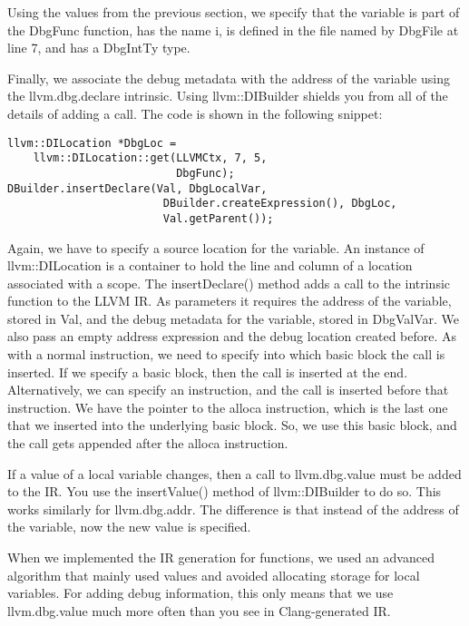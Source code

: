Using the values from the previous section, we specify that the variable is part of the DbgFunc function, has the name i, is defined in the file named by DbgFile at line 7, and has a DbgIntTy type.\par

Finally, we associate the debug metadata with the address of the variable using the llvm.dbg.declare intrinsic. Using llvm::DIBuilder shields you from all of the details of adding a call. The code is shown in the following snippet:\par

\begin{lstlisting}[caption={}]
llvm::DILocation *DbgLoc =
	llvm::DILocation::get(LLVMCtx, 7, 5, 
					      DbgFunc);
DBuilder.insertDeclare(Val, DbgLocalVar,
						DBuilder.createExpression(), DbgLoc,
						Val.getParent());
\end{lstlisting}

Again, we have to specify a source location for the variable. An instance of llvm::DILocation is a container to hold the line and column of a location associated with a scope. The insertDeclare() method adds a call to the intrinsic function to the LLVM IR. As parameters it requires the address of the variable, stored in Val, and the debug metadata for the variable, stored in DbgValVar. We also pass an empty address expression and the debug location created before. As with a normal instruction, we need to specify into which basic block the call is inserted. If we specify a basic block, then the call is inserted at the end. Alternatively, we can specify an instruction, and the call is inserted before that instruction. We have the pointer to the alloca instruction, which is the last one that we inserted into the underlying basic block. So, we use this basic block, and the call gets appended after the alloca instruction.\par

If a value of a local variable changes, then a call to llvm.dbg.value must be added to the IR. You use the insertValue() method of llvm::DIBuilder to do so. This works similarly for llvm.dbg.addr. The difference is that instead of the address of the variable, now the new value is specified.\par

When we implemented the IR generation for functions, we used an advanced algorithm that mainly used values and avoided allocating storage for local variables. For adding debug information, this only means that we use llvm.dbg.value much more often than you see in Clang-generated IR.\par

